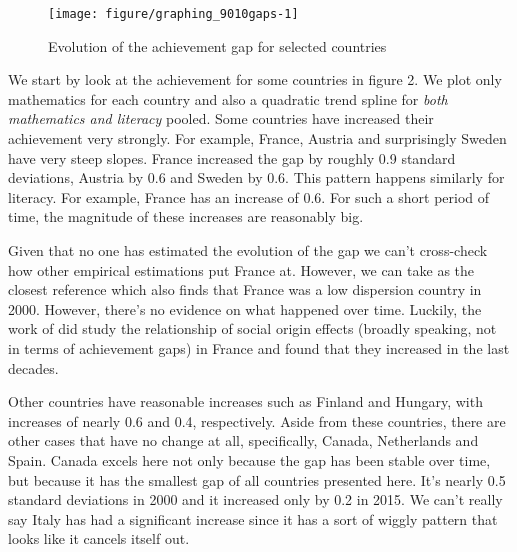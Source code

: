 \documentclass[11pt, a4paper]{article}\usepackage[]{graphicx}\usepackage[]{color}
\begin{document}
\begin{figure}

{\centering \texttt{[image: figure/graphing\_9010gaps-1]} 

}

\caption[Evolution of the achievement gap for selected countries]{Evolution of the achievement gap for selected countries}\label{fig:graphing_9010gaps}
\end{figure}



We start by look at the achievement for some countries in figure 2. We plot only mathematics for each country and also a quadratic trend spline for \emph{both mathematics and literacy} pooled. Some countries have increased their achievement very strongly. For example, France, Austria and surprisingly Sweden have very steep slopes. France increased the gap by roughly 0.9 standard deviations, Austria by 0.6 and Sweden by 0.6. This pattern happens similarly for literacy. For example, France has an increase of 0.6. For such a short period of time, the magnitude of these increases are reasonably big.

Given that no one has estimated the evolution of the gap we can't cross-check how other empirical estimations put France at. However, we can take \citet{micklewright} as the closest reference which also finds that France was a low dispersion country in 2000. However, there's no evidence on what happened over time. Luckily, the work of \citet{bernardi2016} did study the relationship of social origin effects (broadly speaking, not in terms of achievement gaps) in France and found that they increased in the last decades.

Other countries have reasonable increases such as Finland and Hungary, with increases of nearly 0.6 and 0.4, respectively. Aside from these countries, there are other cases that have no change at all, specifically, Canada, Netherlands and Spain. Canada excels here not only because the gap has been stable over time, but because it has the smallest gap of all countries presented here. It's nearly 0.5 standard deviations in 2000 and it increased only by 0.2 in 2015. We can't really say Italy has had a significant increase since it has a sort of wiggly pattern that looks like it cancels itself out.
\end{document}
